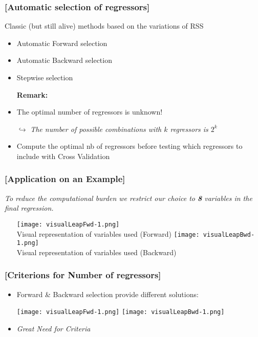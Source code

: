 \documentclass[xcolor=x11names,compress]{beamer}
\renewcommand{\(}{\begin{columns}}
\renewcommand{\)}{\end{columns}}
\newcommand{\<}[1]{\begin{column}{#1}}
\renewcommand{\>}{\end{column}}
\begin{document}
\begin{frame} %
\frametitle{\textcolor{brique}{[Automatic selection of regressors]}}
Classic (but still alive) methods based on the variations of RSS
\pause
\begin{itemize}[<+->]
  \item Automatic Forward selection
  \item Automatic Backward selection
  \item Stepwise selection
  \item[\textbf{Remark:}]
  \item The optimal number of regressors is unknown!
  \item[$\hookrightarrow$] \textit{The number of possible combinations with $k$ regressors is $2^k$ }
  \item Compute the optimal nb of regressors before testing which regressors to include with Cross Validation
\end{itemize}
\end{frame}

\begin{frame} %
\frametitle{\textcolor{brique}{[Application on an Example]}}
\emph{To reduce the computational burden we restrict our choice to \textbf{8} variables in the final regression.}
\pause
\begin{itemize}
  \item[]
   { \texttt{[image: visualLeapFwd-1.png]} \\ }
   {Visual representation of variables used (Forward) }
   {\texttt{[image: visualLeapBwd-1.png]} \\ }
   {Visual representation of variables used (Backward) }
\end{itemize}
\end{frame}

\begin{frame} %
\frametitle{\textcolor{brique}{[Criterions for  Number of regressors]}}

\pause
\begin{itemize}[<+->]
  \item Forward \& Backward selection provide different solutions:
  \item[] \texttt{[image: visualLeapFwd-1.png]} \texttt{[image: visualLeapBwd-1.png]}
  \item \begin{center} \emph{Great Need for Criteria} \end{center}
\end{itemize}
\end{frame}
\end{document}
